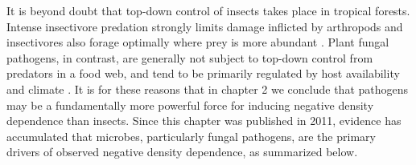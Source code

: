 \documentclass[b5paper,justified]{tufte-book} %
\begin{document}
It is beyond doubt that top-down control of insects takes place in tropical forests.  Intense insectivore predation strongly limits damage inflicted by arthropods \citep{Kalka2008, Williams-Guillen2008} and insectivores also forage optimally where prey is more abundant \citep{Muler2012}. Plant fungal pathogens, in contrast, are generally not subject to top-down control from predators in a food web, and tend to be primarily regulated by host availability and climate \citep{Agrios2005, Thompson2010}. It is for these reasons that in chapter 2 we conclude that pathogens may be a fundamentally more powerful force for inducing negative density dependence than insects. Since this chapter was published in 2011, evidence has accumulated that microbes, particularly fungal pathogens, are the primary drivers of observed negative density dependence, as summarized below. \nocite{Kunz1995} \nocite{Bateman1974} \nocite{Kalko1997}
\end{document}
